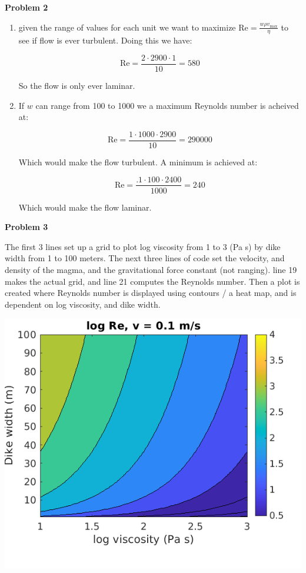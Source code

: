 \documentclass{article}
\begin{document}
\noindent\textbf{Problem 2}
\begin{enumerate}
\item given the range of values for each unit we want to maximize $\text{Re} = \frac{w\rho v_{\text{max}}}{\eta}$ to see if flow is ever turbulent. Doing this we have:

  $$\text{Re} = \frac{2 \cdot 2900 \cdot 1}{10} = 580$$

  So the flow is only ever laminar.

\item If $w$ can range from 100 to 1000 we a maximum Reynolds number is acheived at:

  $$\text{Re} = \frac{1 \cdot 1000 \cdot 2900}{10} = 290000$$

  Which would make the flow turbulent. A minimum is achieved at:

  $$\text{Re} = \frac{.1 \cdot 100 \cdot 2400}{1000} = 240$$

  Which would make the flow laminar.
  
\end{enumerate}

\vspace{5mm}

\noindent\textbf{Problem 3}

\noindent The first 3 lines set up a grid to plot log viscosity from 1 to 3 (Pa s) by dike width from 1 to 100 meters. The next three lines of code set the velocity, and  density of the magma, and the gravitational force constant (not ranging). line 19 makes the actual grid, and line 21 computes the Reynolds number. Then a plot is created where Reynolds number is displayed using contours / a heat map, and is dependent on log viscosity, and dike width.


\includegraphics[scale=.5]{vpoint1.png}
\end{document}
